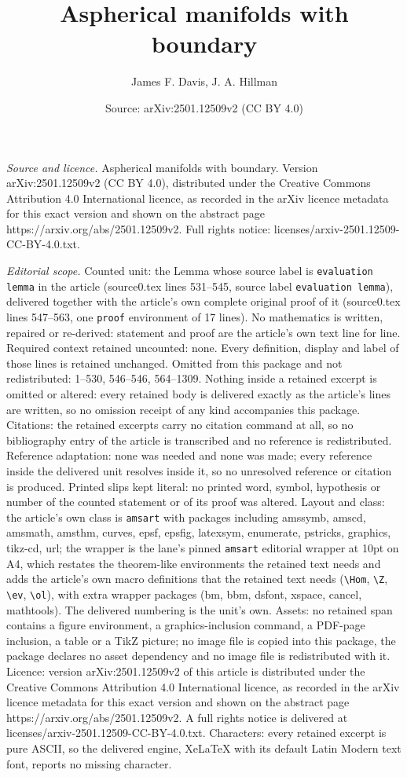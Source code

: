 \documentclass[10pt,a4paper]{amsart}
\title[Aspherical manifolds with boundary]{Aspherical manifolds with boundary}
\author{James F. Davis, J. A. Hillman}
\date{Source: arXiv:2501.12509v2 (CC BY 4.0)}
\begin{document}
\maketitle

\noindent\emph{Source and licence.} Aspherical manifolds with boundary. Version arXiv:2501.12509v2 (CC BY 4.0), distributed under the Creative Commons Attribution 4.0 International licence, as recorded in the arXiv licence metadata for this exact version and shown on the abstract page https://arxiv.org/abs/2501.12509v2. Full rights notice: licenses/arxiv-2501.12509-CC-BY-4.0.txt.\par\smallskip

\noindent\textit{Editorial scope.} Counted unit: the Lemma whose source label is \texttt{evaluation lemma} in the article (source0.tex lines 531--545, source label \texttt{evaluation lemma}), delivered together with the article's own complete original proof of it (source0.tex lines 547--563, one \texttt{proof} environment of 17 lines). No mathematics is written, repaired or re-derived: statement and proof are the article's own text line for line. Required context retained uncounted: none. Every definition, display and label of those lines is retained unchanged. Omitted from this package and not redistributed: 1--530, 546--546, 564--1309. Nothing inside a retained excerpt is omitted or altered: every retained body is delivered exactly as the article's lines are written, so no omission receipt of any kind accompanies this package. Citations: the retained excerpts carry no citation command at all, so no bibliography entry of the article is transcribed and no reference is redistributed. Reference adaptation: none was needed and none was made; every reference inside the delivered unit resolves inside it, so no unresolved reference or citation is produced. Printed slips kept literal: no printed word, symbol, hypothesis or number of the counted statement or of its proof was altered. Layout and class: the article's own class is \texttt{amsart} with packages including amssymb, amscd, amsmath, amsthm, curves, epsf, epsfig, latexsym, enumerate, pstricks, graphics, tikz-cd, url; the wrapper is the lane's pinned \texttt{amsart} editorial wrapper at 10pt on A4, which restates the theorem-like environments the retained text needs and adds the article's own macro definitions that the retained text needs (\texttt{\textbackslash Hom}, \texttt{\textbackslash Z}, \texttt{\textbackslash ev}, \texttt{\textbackslash ol}), with extra wrapper packages (bm, bbm, dsfont, xspace, cancel, mathtools). The delivered numbering is the unit's own. Assets: no retained span contains a figure environment, a graphics-inclusion command, a PDF-page inclusion, a table or a TikZ picture; no image file is copied into this package, the package declares no asset dependency and no image file is redistributed with it. Licence: version arXiv:2501.12509v2 of this article is distributed under the Creative Commons Attribution 4.0 International licence, as recorded in the arXiv licence metadata for this exact version and shown on the abstract page https://arxiv.org/abs/2501.12509v2. A full rights notice is delivered at licenses/arxiv-2501.12509-CC-BY-4.0.txt. Characters: every retained excerpt is pure ASCII, so the delivered engine, XeLaTeX with its default Latin Modern text font, reports no missing character.
\end{document}
